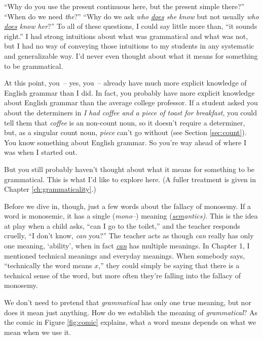 ``Why do you use the present continuous here, but the present simple there?'' ``When do we need \textit{the}?'' ``Why do we ask \textit{who \uline{does} she know} but not usually \textit{who \uline{does} know her}?'' To all of these questions, I could say little more than, ``it sounds right.'' I had strong intuitions about what was grammatical and what was not, but I had no way of conveying those intuitions to my students in any systematic and generalizable way. I'd never even thought about what it means for something to be grammatical.

At this point, you~-- yes, you~-- already have much more explicit knowledge of English grammar than I did. In fact, you probably have more explicit knowledge about English grammar than the average college professor. If a student asked you about the determiners in \textit{I had coffee and a piece of toast for breakfast}, you could tell them that \textit{coffee} is an non-count noun, so it doesn't require a determiner, but, as a singular count noun, \textit{piece} can't go without (see Section \ref{sec:count}). You know something about English grammar. So you're way ahead of where I was when I started out.

But you still probably haven't thought about what it means for something to be grammatical. This is what I'd like to explore here. (A fuller treatment is given in Chapter \ref{ch:grammaticality}.)

\begin{tcolorbox}[title=The fallacy of monosemy\is{fallacy of monosemy|(}, colback=white] \label{sec:fallacy-of-monosemy}
    Before we dive in, though, just a few words about the fallacy of monosemy. If a word is monosemic, it has a single (\textit{mono--}) meaning (\textit{\uline{sem}antics)}. This is the idea at play when a child asks, ``can I go to the toilet,'' and the teacher responds cruelly, ``I don't know, \textit{can} you?'' The teacher acts as though \textit{can} really has only one meaning, `ability', when in fact \href{https://www.ldoceonline.com/dictionary/can}{\textit{can}} has multiple meanings. In Chapter 1, I mentioned technical meanings and everyday meanings. When somebody says, ``technically the word means $x$,'' they could simply be saying that there is a technical sense of the word, but more often they're falling into the fallacy of monosemy.
\end{tcolorbox}\label{sec:monosemy}

We don't need to pretend that \textit{grammatical} has only one true meaning, but nor does it mean just anything. How do we establish the meaning of \textit{grammatical}? As the comic in Figure \ref{fig:comic} explains, what a word means depends on what we mean when we use it.

